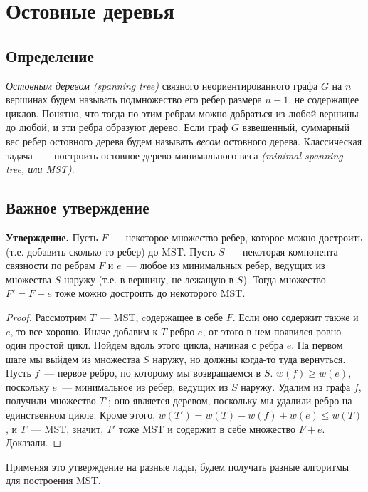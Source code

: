 \documentclass[12pt]{article}
\renewcommand{\leq}{\leqslant}
\renewcommand{\geq}{\geqslant}
\begin{document}
\section{Остовные деревья}

\subsection{Определение}

\emph{Остовным деревом (spanning tree)} связного неориентированного графа $G$ на $n$ вершинах будем называть подмножество его ребер размера $n-1$, не содержащее циклов. 
Понятно, что тогда по этим ребрам можно добраться из любой вершины до любой, и эти ребра образуют дерево. Если граф $G$ взвешенный, суммарный 
вес ребер остовного дерева будем называть \emph{весом} остовного дерева. Классическая задача ~--- построить остовное дерево минимального веса \emph{(minimal spanning tree, или MST)}.

\subsection{Важное утверждение}

\textbf{Утверждение.} Пусть $F$~--- некоторое множество ребер, которое можно достроить (т.е. добавить сколько-то ребер) до MST. Пусть $S$~--- некоторая компонента связности по ребрам $F$ и $e$~--- любое из минимальных ребер, ведущих из множества $S$ наружу (т.е. в вершину, не лежащую в $S$). Тогда множество $F' = F + e$ тоже можно достроить до некоторого MST.

\begin{proof}

Рассмотрим $T$~--- MST, cодержащее в себе $F$. Если оно содержит также и $e$, то все хорошо. Иначе добавим к $T$ ребро $e$, от этого в нем появился ровно один простой цикл. Пойдем вдоль этого цикла, начиная с ребра $e$. На первом шаге мы выйдем из множества $S$ наружу, но должны когда-то туда вернуться. Пусть $f$~--- первое ребро, по которому мы возвращаемся в $S$. $w(f) \geq w(e)$, поскольку $e$~--- минимальное из ребер, ведущих из $S$ наружу. Удалим из графа $f$, получили множество $T'$; оно является деревом, поскольку мы удалили ребро на единственном цикле. Кроме этого, $w(T') = w(T) - w(f) + w(e) \leq w(T)$, и $T$~--- MST, значит, $T'$ тоже MST и содержит в себе множество $F + e$. Доказали.

\end{proof}

Применяя это утверждение на разные лады, будем получать разные алгоритмы для построения MST.
\end{document}
